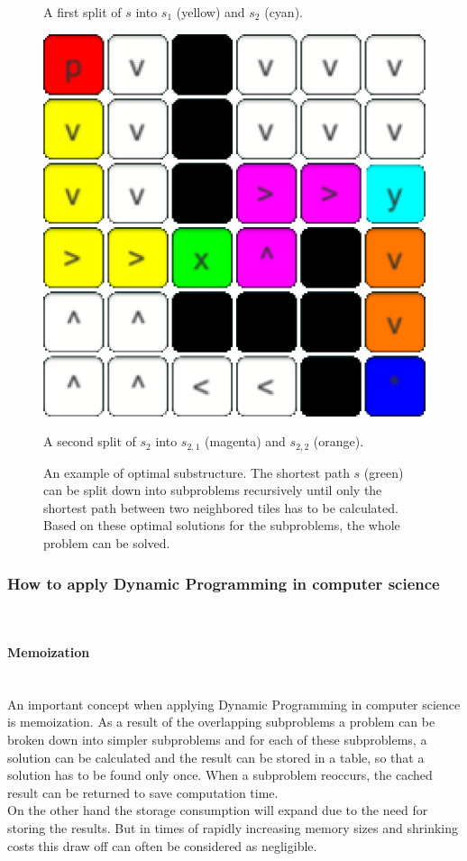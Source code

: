 \documentclass[conference]{IEEEtran}
\begin{document}
\begin{figure}[h]
\begin{minipage}[t]{0.3\linewidth}
\caption{A first split of $s$ into $s_1$ (yellow) and $s_2$ (cyan).}
\end{minipage}
\hfill
\begin{minipage}[t]{0.3\linewidth}
\centering
\includegraphics[width=1\textwidth]{images/OptimalSubstructure/second.png}
\caption{A second split of $s_2$ into $s_{2,1}$ (magenta) and $s_{2,2}$ (orange).}
\end{minipage}
\caption{An example of optimal substructure. The shortest path $s$ (green) can be split down into subproblems recursively until only the shortest path between two neighbored tiles has to be calculated. Based on these optimal solutions for the subproblems, the whole problem can be solved.}
\end{figure}

\subsubsection{How to apply Dynamic Programming in computer science}
\quad \\
\paragraph{Memoization}
\quad \\
An important concept when applying Dynamic Programming in computer science is memoization. As a result of the overlapping subproblems a problem can be broken down into simpler subproblems and for each of these subproblems, a solution can be calculated and the result can be stored in a table, so that a solution has to be found only once. When a subproblem reoccurs, the cached result can be returned to save computation time. \cite{Cormen.2007}
\\
On the other hand the storage consumption will expand due to the need for storing the results. But in times of rapidly increasing memory sizes and shrinking costs this draw off can often be considered as negligible. \cite{Cormen.2007}
\\
\end{document}
